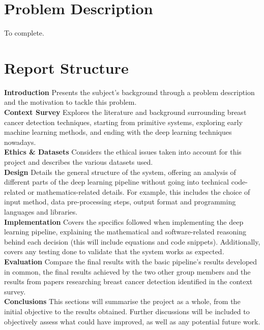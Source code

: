 \section{Problem Description}
\label{sec:problem-description}

To complete.


\section{Report Structure}

\tab \textbf{Introduction} \space 
Presents the subject's background through a problem description and the motivation to tackle this problem.\\

\textbf{Context Survey} \space
Explores the literature and background surrounding breast cancer detection techniques, starting from primitive systems, exploring early machine learning methods, and ending with the deep learning techniques nowadays.\\

\textbf{Ethics \& Datasets} \space
Considers the ethical issues taken into account for this project and describes the various datasets used.\\

\textbf{Design} \space
Details the general structure of the system, offering an analysis of different parts of the deep learning pipeline without going into technical code-related or mathematics-related details. For example, this includes the choice of input method, data pre-processing steps, output format and programming languages and libraries.\\

\textbf{Implementation} \space
Covers the specifics followed when implementing the deep learning pipeline, explaining the mathematical and software-related reasoning behind each decision (this will include equations and code snippets). Additionally, covers any testing done to validate that the system works as expected.\\

\textbf{Evaluation} \space
Compare the final results with the basic pipeline’s results developed in common, the final results achieved by the two other group members and the results from papers researching breast cancer detection identiﬁed in the context survey.\\

\textbf{Conclusions} \space
This sections will summarise the project as a whole, from the initial objective to the results obtained. Further discussions will be included to objectively assess what could have improved, as well as any potential future work.